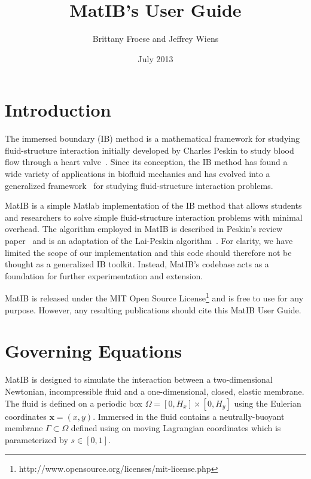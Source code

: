 \documentclass{article}
\title{MatIB's User Guide}
\author{Brittany Froese and Jeffrey Wiens}
\date{July 2013}
\newcommand{\bs}[1]{\boldsymbol{#1}}
\begin{document}
\maketitle

\section{Introduction}\label{sec:intro}

The immersed boundary (IB) method is a mathematical framework for studying fluid-structure interaction  
initially developed by Charles Peskin to study blood flow through a heart valve~\cite{PeskinHearts}. 
Since its conception, the IB method has found a wide variety of applications in biofluid mechanics and has
evolved into a generalized framework~\cite{PeskinIB} for studying fluid-structure interaction problems. 

MatIB is a simple Matlab implementation of the IB method that allows students and researchers to 
solve simple fluid-structure interaction problems with minimal overhead. 
The algorithm employed in MatIB is described in Peskin's review paper~\cite{PeskinIB} 
and is an adaptation of the Lai-Peskin algorithm~\cite{LaiAlgorithm}. For clarity, we have limited 
the scope of our implementation and this code should therefore not be thought as a generalized IB toolkit. 
Instead, MatIB's codebase acts as a foundation for further experimentation and extension.

MatIB is released under the 
MIT Open Source License\footnote{http://www.opensource.org/licenses/mit-license.php} and is free to use 
for any purpose. However, any resulting publications should cite this
MatIB User Guide.


\section{Governing Equations}\label{sec:equations}

MatIB is designed to simulate the interaction between a two-dimensional Newtonian, incompressible fluid 
and a one-dimensional, closed, elastic membrane. The fluid is defined on a periodic box $\Omega = [0,H_x] \times [0,H_y]$
using the Eulerian coordinates $\bs{x} = (x,y)$. Immersed in the fluid contains a neutrally-buoyant membrane $\Gamma \subset \Omega$
defined using on moving Lagrangian coordinates which is parameterized by $s \in [0,1]$.
\end{document}
